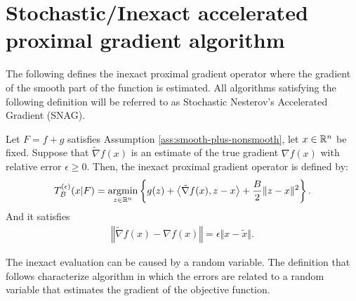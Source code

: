 \documentclass[12pt]{article}
\begin{document}
\section{Stochastic/Inexact accelerated proximal gradient algorithm}
    The following defines the inexact proximal gradient operator where the gradient of the smooth part of the function is estimated. 
    All algorithms satisfying the following definition will be referred to as Stochastic Nesterov's Accelerated Gradient (SNAG). 
    \begin{definition}
        Let $F = f + g$ satisfies Assumption \ref{ass:smooth-plus-nonsmooth}, let $x \in \mathbb R^n$ be fixed. 
        Suppose that $\tilde \nabla f(x)$ is an estimate of the true gradient $\nabla f(x)$ with relative error $\epsilon \ge 0$. 
        Then, the inexact proximal gradient operator is defined by: 
        \begin{align*}
            T_B^{(\epsilon)}(x | F) = \mathop{\rm argmin}\limits_{z \in \mathbb R^n}\left\lbrace
                g(z) + \left\langle \tilde \nabla f(x), z - x\right\rangle
                + \frac{B}{2}\Vert z - x\Vert^2
            \right\rbrace. 
        \end{align*}
        And it satisfies 
        \begin{align*}
            \left\Vert \tilde \nabla f(x) - \nabla f(x)\right\Vert = \epsilon \Vert x - \tilde x\Vert. 
        \end{align*}
    \end{definition}
    The inexact evaluation can be caused by a random variable. 
    The definition that follows characterize algorithm in which the errors are related to a random variable that estimates the gradient of the objective function. 
\end{document}
